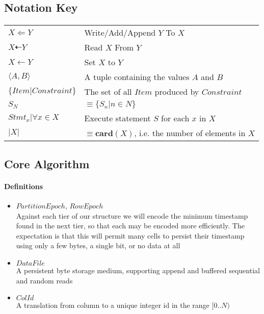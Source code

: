 \documentclass[fleqn]{article}
\begin{document}
\subsection{Notation Key}
\paragraph{}
\begin{tabular}{l l}
$X \Leftarrow Y$ & Write/Add/Append $Y$ To $X$\\
$X \dashleftarrow Y$ & Read $X$ From $Y$\\
$X \gets Y$ & Set $X$ to $Y$\\
$\langle A,B \rangle$ & A tuple containing the values $A$ and $B$\\
$\{Item | Constraint\}$ & The set of all $Item$ produced by $Constraint$\\
$S_N$ & $\equiv \{S_n | n \in N\}$\\
$Stmt_x | \forall x \in X$ & Execute statement $S$ for each $x$ in $X$\\
$\lvert X \rvert$ & $\equiv \mathbf{card}(X)$, i.e. the number of elements in $X$\\
\end{tabular}

\clearpage
\subsection{Core Algorithm}
\paragraph{Definitions}
\begin{itemize}
  \item $PartitionEpoch$, $RowEpoch$\\[2pt]
    Against each tier of our structure we will encode the minimum timestamp found in the next
    tier, so that each may be encoded more efficiently. The expectation is that this will permit
    many cells to persist their timestamp using only a few bytes, a single bit, or no data at all
  \item $DataFile$\\[2pt]
    A persistent byte storage medium, supporting append and buffered sequential and random reads
  \item $ColId$\\[2pt]
    A translation from column to a unique integer id in the range $[0..N)$
\end{itemize}
\end{document}
